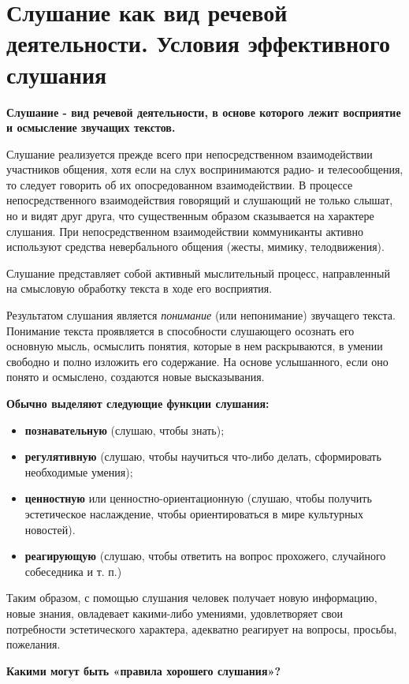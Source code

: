 \section{Слушание как вид речевой деятельности. Условия эффективного слушания}

\textbf{Слушание - вид речевой деятельности, в основе которого лежит восприятие и осмысление звучащих текстов.}

Слушание реализуется прежде всего при непосредственном взаимодействии участников общения, хотя если на слух воспринимаются радио- и телесообщения, то следует говорить об их опосредованном взаимодействии. 
В процессе непосредственного взаимодействия говорящий и слушающий не только слышат, но и видят друг друга, что существенным образом сказывается на характере слушания. 
При непосредственном взаимодействии коммуниканты активно используют средства невербального общения (жесты, мимику, телодвижения).

Слушание представляет собой активный мыслительный процесс, направленный на смысловую обработку текста в ходе его восприятия. 

Результатом слушания является \textit{понимание} (или непонимание) звучащего текста. 
Понимание текста проявляется в способности слушающего осознать его основную мысль, осмыслить понятия, которые в нем раскрываются, в умении свободно и полно изложить его содержание. На основе услышанного, если оно понято и осмыслено, создаются новые высказывания.

\textbf{Обычно выделяют следующие функции слушания: }
\begin{itemize}
	\item \textbf{познавательную} (слушаю, чтобы знать);
	\item \textbf{регулятивную }(слушаю, чтобы научиться что-либо делать, сформировать необходимые умения); 
	\item \textbf{ценностную} или ценностно-ориентационную (слушаю, чтобы получить эстетическое наслаждение, чтобы ориентироваться в мире культурных новостей).
	\item \textbf{реагирующую} (слушаю, чтобы ответить на вопрос прохожего, случайного собеседника и т. п.)
\end{itemize}

Таким образом, с помощью слушания человек получает новую информацию, новые знания, овладевает какими-либо умениями, удовлетворяет свои потребности эстетического характера, адекватно реагирует на вопросы, просьбы, пожелания.

\begin{center}
	\textbf{Какими могут быть «правила хорошего слушания»?}
\end{center}

